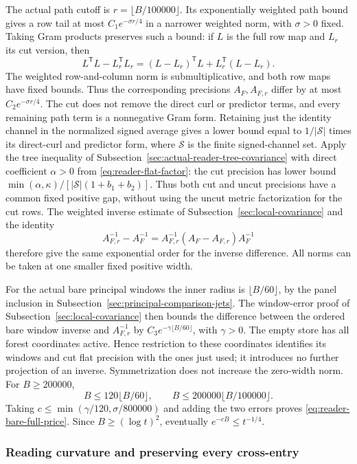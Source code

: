The actual path cutoff is $r=\lfloor B/100000\rfloor$. Its
exponentially weighted path bound gives a row tail at most
$C_1e^{-\sigma r/4}$ in a narrower weighted norm, with
$\sigma>0$ fixed. Taking Gram products preserves such a bound:
if $L$ is the full row map and $L_r$ its cut version, then
\[
 L^{\mathsf T}L-L_r^{\mathsf T}L_r
 =(L-L_r)^{\mathsf T}L+L_r^{\mathsf T}(L-L_r).
\]
The weighted row-and-column norm is submultiplicative, and both
row maps have fixed bounds. Thus the corresponding precisions
$A_F,A_{F,r}$ differ by at most $C_2e^{-\sigma r/4}$.
The cut does not remove the direct curl or predictor terms, and
every remaining path term is a nonnegative Gram form. Retaining
just the identity channel in the normalized signed average gives
a lower bound equal to $1/|\mathcal S|$ times its direct-curl and
predictor form, where $\mathcal S$ is the finite signed-channel set.
Apply the tree inequality of Subsection~\ref{sec:actual-reader-tree-covariance}
with direct coefficient $\alpha>0$ from
\eqref{eq:reader-flat-factor}: the cut precision has lower bound
$\min(\alpha,\kappa)/[|\mathcal S|(1+b_1+b_2)]$. Thus both
cut and uncut precisions have a common fixed positive gap, without
using the uncut metric factorization for the cut rows.
The weighted inverse estimate of Subsection~\ref{sec:local-covariance}
and the identity
\[
 A_{F,r}^{-1}-A_F^{-1}
 =A_{F,r}^{-1}(A_F-A_{F,r})A_F^{-1}
\]
therefore give the same exponential order for the inverse difference.
All norms can be taken at one smaller fixed positive width.

For the actual bare principal windows the inner radius is
$\lfloor B/60\rfloor$, by the panel inclusion in
Subsection~\ref{sec:principal-comparison-jets}. The window-error proof
of Subsection~\ref{sec:local-covariance} then bounds the difference
between the ordered bare window inverse and $A_{F,r}^{-1}$ by
$C_3e^{-\gamma\lfloor B/60\rfloor}$, with $\gamma>0$.
The empty store has all forest coordinates active. Hence restriction
to these coordinates identifies its windows and cut flat precision
with the ones just used; it introduces no further projection of an
inverse. Symmetrization does not increase the zero-width norm.
For $B\ge200000$,
\[
 B\le120\lfloor B/60\rfloor,\qquad
 B\le200000\lfloor B/100000\rfloor.
\]
Taking $c\le\min(\gamma/120,\sigma/800000)$ and adding the two
errors proves \eqref{eq:reader-bare-full-price}. Since
$B\ge(\log t)^2$, eventually $e^{-cB}\le t^{-1/4}$.

\subsubsection{Reading curvature and preserving every cross-entry}

